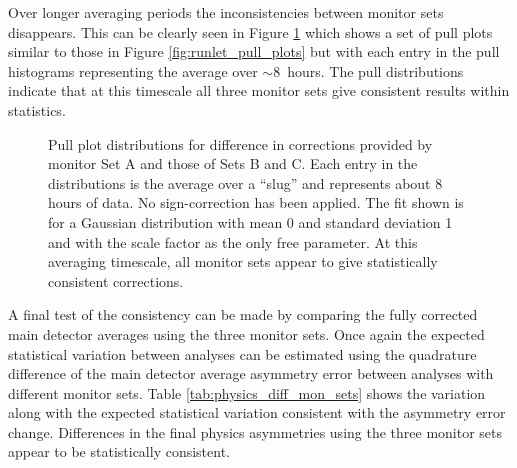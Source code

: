 Over longer averaging periods the inconsistencies between monitor sets disappears. This can be clearly seen in Figure \ref{fig:slug_pull_plots} which shows a set of pull plots similar to those in Figure \ref{fig:runlet_pull_plots} but with each entry in the pull histograms representing the average over  $\sim 8$~hours. The pull distributions indicate that at this timescale all three monitor sets give consistent results within statistics.  
\begin{figure}[ht]

\centering
{}
\caption{Pull plot distributions for difference in corrections provided by monitor Set A and those of Sets B and C.  Each entry in the distributions is the average over a ``slug'' and represents about 8 hours of data. No sign-correction has been applied. The fit shown is for a Gaussian distribution with mean 0 and standard deviation 1 and with the scale factor as the only free parameter. At this averaging timescale, all monitor sets appear to give statistically consistent corrections. }
\label{fig:slug_pull_plots}
\end{figure}
 
A final test of the consistency can be made by comparing the fully corrected main detector averages using the three monitor sets. Once again the expected statistical variation between analyses can be estimated using the quadrature difference of the main detector average asymmetry error between analyses with different monitor sets. Table \ref{tab:physics_diff_mon_sets} shows the variation along with the expected statistical variation consistent with the asymmetry error change. Differences in the final physics asymmetries using the three monitor sets appear to be statistically consistent. 

